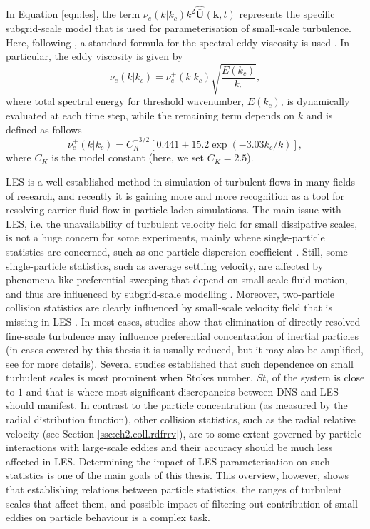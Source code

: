 \documentclass{pracamgren}
\begin{document}
In Equation \ref{eqn:les}, the term $\nu_{e}(k|k_{c})k^{2} \hat{\bar{\mathbf{U}}}(\mathbf{k}, t)$ represents the specific subgrid-scale model that is used for parameterisation of small-scale turbulence.
Here, following \textcite{Rosa2017}, a standard formula for the spectral eddy viscosity is used \parencite[see][]{Chollet1981}.
In particular, the eddy viscosity is given by
\begin{equation}
\nu_{e}(k|k_{c}) = \nu_{e}^{+}(k|k_{c}) \sqrt{\frac{E(k_{c})}{k_c}} ,
\label{eqn:sgs-1}
\end{equation}
where total spectral energy for threshold wavenumber, $E(k_c)$, is dynamically evaluated at each time step, while the remaining term depends on $k$ and is defined as follows
\begin{equation}
\nu_{e}^{+}(k|k_{c}) = C_{K}^{-3/2} [ 0.441 + 15.2 \exp( -3.03 k_{c} / k) ] ,
\label{eqn:sgs-2}
\end{equation}
where $C_{K}$ is the model constant (here, we set $C_{K} = 2.5$).

\medskip

LES is a well-established method in simulation of turbulent flows in many fields of research, and recently it is gaining more and more recognition as a tool for resolving carrier fluid flow in particle-laden simulations.
The main issue with LES, i.e. the unavailability of turbulent velocity field for small dissipative scales, is not a huge concern for some experiments, mainly whene single-particle statistics are concerned, such as one-particle dispersion coefficient \parencite{Yang2008}.
Still, some single-particle statistics, such as average settling velocity, are affected by phenomena like preferential sweeping that depend on small-scale fluid motion, and thus are influenced by subgrid-scale modelling \parencite{Rosa2017,Tom2019}.
Moreover, two-particle collision statistics are clearly influenced by small-scale velocity field that is missing in LES \parencite{Jin2010}.
In most cases, studies show that elimination of directly resolved fine-scale turbulence may influence preferential concentration of inertial particles (in cases covered by this thesis it is usually reduced, but it may also be amplified, see \textcite{Fede2006} for more details).
Several studies established that such dependence on small turbulent scales is most prominent when Stokes number, $St$, of the system is close to $1$ \parencite{Wang2000,Pozorski2009,Jin2010} and that is where most significant discrepancies between DNS and LES should manifest.
In contrast to the particle concentration (as measured by the radial distribution function), other collision statistics, such as the radial relative velocity (see Section \ref{ssc:ch2.coll.rdfrrv}), are to some extent governed by particle interactions with large-scale eddies \parencite{Wang2000} and their accuracy should be much less affected in LES. 
Determining the impact of LES parameterisation on such statistics is one of the main goals of this thesis.
This overview, however, shows that establishing relations between particle statistics, the ranges of turbulent scales that affect them, and possible impact of filtering out contribution of small eddies on particle behaviour is a complex task.
\end{document}
